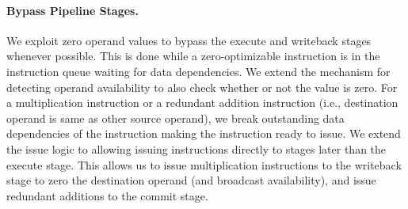 \paragraph{Bypass Pipeline Stages.}
We exploit zero operand values to bypass the execute and writeback stages whenever possible.  This is done while a zero-optimizable instruction is in the instruction queue waiting for data dependencies.  We extend the mechanism for detecting operand availability to also check whether or not the value is zero.  For a multiplication instruction or a redundant addition instruction (i.e., destination operand is same as other source operand), we break outstanding data dependencies of the instruction making the instruction ready to issue.  We extend the issue logic to allowing issuing instructions directly to stages later than the execute stage.  This allows us to issue multiplication instructions to the writeback stage to zero the destination operand (and broadcast availability), and issue redundant additions to the commit stage.   



 

